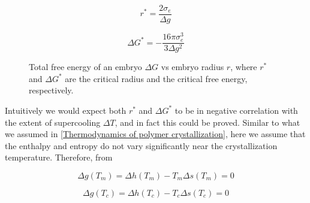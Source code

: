 \begin{equation}
\label{eqn_critical radius of embryo}
r^{*} = \dfrac{2\sigma_{e}}{\Delta g}
\end{equation}

\begin{equation}
\label{eqn_critical energy of embryo}
\Delta G^{*} = -\dfrac{16\pi\sigma_{e}^{3}}{3\Delta g^{2}}
\end{equation}

\begin{figure}[H]
\center
\vspace{1 cm}
\caption{Total free energy of an embryo $\Delta G$ vs embryo radius $r$, where $r^{*}$ and $\Delta G^{*}$ are the critical radius and the critical free energy, respectively.}
\label{fig:Delta G embryo}
\end{figure}

Intuitively we would expect both $r^{*}$ and $\Delta G^{*}$ to be in negative correlation with the extent of supercooling $\Delta T$, and in fact this could be proved. Similar to what we assumed in \ref{Thermodynamics of polymer crystallization}, here we assume that the enthalpy and entropy do not vary significantly near the crystallization temperature. Therefore, from

\begin{equation}
\label{eqn_Delta g at Tm}
\Delta g(T_{m}) = \Delta h(T_{m}) - T_{m}\Delta s(T_{m}) = 0
\end{equation}


\begin{equation}
\label{eqn_Delta g at Tc}
\Delta g(T_{c}) = \Delta h(T_{c}) - T_{c}\Delta s(T_{c}) = 0
\end{equation}

